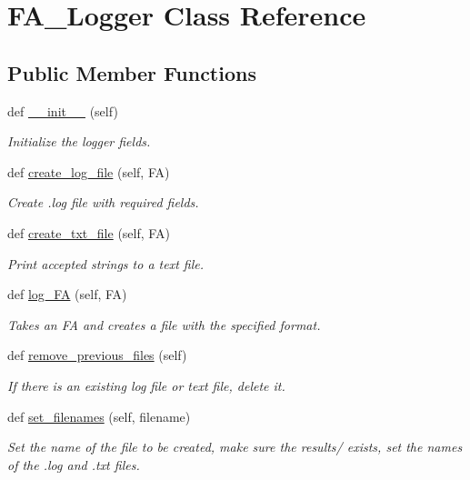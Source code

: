 \hypertarget{classfa__logger_1_1_f_a___logger}{}\section{F\+A\+\_\+\+Logger Class Reference}
\label{classfa__logger_1_1_f_a___logger}
\subsection*{Public Member Functions}
\begin{DoxyCompactItemize}
\item 
def \mbox{\hyperlink{classfa__logger_1_1_f_a___logger_ae64f0875afe3067b97ba370b354b9213}{\+\_\+\+\_\+init\+\_\+\+\_\+}} (self)
\begin{DoxyCompactList}\small\item\em Initialize the logger fields. \end{DoxyCompactList}\item 
def \mbox{\hyperlink{classfa__logger_1_1_f_a___logger_ab65d7bfdf1064996848a8f66cc51a8bc}{create\+\_\+log\+\_\+file}} (self, FA)
\begin{DoxyCompactList}\small\item\em Create .log file with required fields. \end{DoxyCompactList}\item 
def \mbox{\hyperlink{classfa__logger_1_1_f_a___logger_a2b8f832136f088b2c9cbb581e269736d}{create\+\_\+txt\+\_\+file}} (self, FA)
\begin{DoxyCompactList}\small\item\em Print accepted strings to a text file. \end{DoxyCompactList}\item 
def \mbox{\hyperlink{classfa__logger_1_1_f_a___logger_a1a28f2676eeb8c10690675c7595c4841}{log\+\_\+\+FA}} (self, FA)
\begin{DoxyCompactList}\small\item\em Takes an FA and creates a file with the specified format. \end{DoxyCompactList}\item 
def \mbox{\hyperlink{classfa__logger_1_1_f_a___logger_a1946635ab60794dcc17d9f394f043b9b}{remove\+\_\+previous\+\_\+files}} (self)
\begin{DoxyCompactList}\small\item\em If there is an existing log file or text file, delete it. \end{DoxyCompactList}\item 
def \mbox{\hyperlink{classfa__logger_1_1_f_a___logger_a0d497d461f3694c2cb33d896dc333192}{set\+\_\+filenames}} (self, filename)
\begin{DoxyCompactList}\small\item\em Set the name of the file to be created, make sure the results/ exists, set the names of the .log and .txt files. \end{DoxyCompactList}\end{DoxyCompactItemize}
